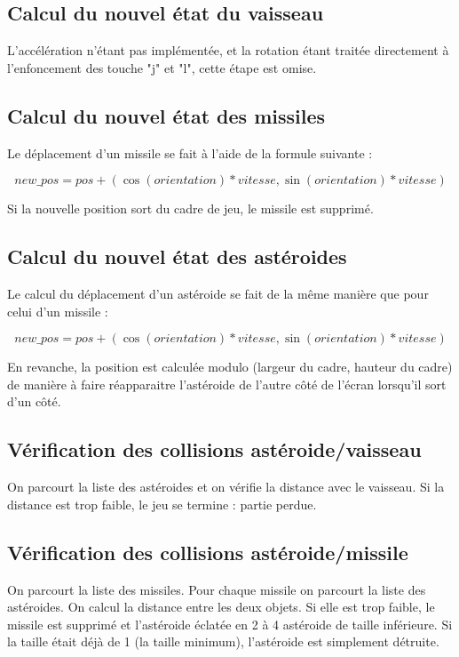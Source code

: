 \documentclass[a4paper,10pt,openany,oneside]{report}
\begin{document}
\subsection{Calcul du nouvel état du vaisseau}

L'accélération n'étant pas implémentée, et la rotation étant traitée
directement à l'enfoncement des touche "j" et "l", cette étape est omise.

\subsection{Calcul du nouvel état des missiles}

Le déplacement d'un missile se fait à l'aide de la formule suivante :

\[new\_pos = pos + (\cos (orientation) * vitesse, \sin(orientation) * vitesse)\]

Si la nouvelle position sort du cadre de jeu, le missile est supprimé.

\subsection{Calcul du nouvel état des astéroides}

Le calcul du déplacement d'un astéroide se fait de la même manière que pour
celui d'un missile :

\[new\_pos = pos + (\cos (orientation) * vitesse, \sin(orientation) * vitesse)\]

En revanche, la position est calculée modulo (largeur du cadre, hauteur du
cadre) de manière à faire réapparaitre l'astéroide de l'autre côté de l'écran
lorsqu'il sort d'un côté.

\subsection{Vérification des collisions astéroide/vaisseau}

On parcourt la liste des astéroides et on vérifie la distance avec le vaisseau.
Si la distance est trop faible, le jeu se termine : partie perdue.

\subsection{Vérification des collisions astéroide/missile}

On parcourt la liste des missiles. Pour chaque missile on parcourt la liste des
astéroides. On calcul la distance entre les deux objets. Si elle est trop faible,
le missile est supprimé et l'astéroide éclatée en 2 à 4 astéroide de taille
inférieure. Si la taille était déjà de 1 (la taille minimum), l'astéroide est
simplement détruite.
\end{document}
